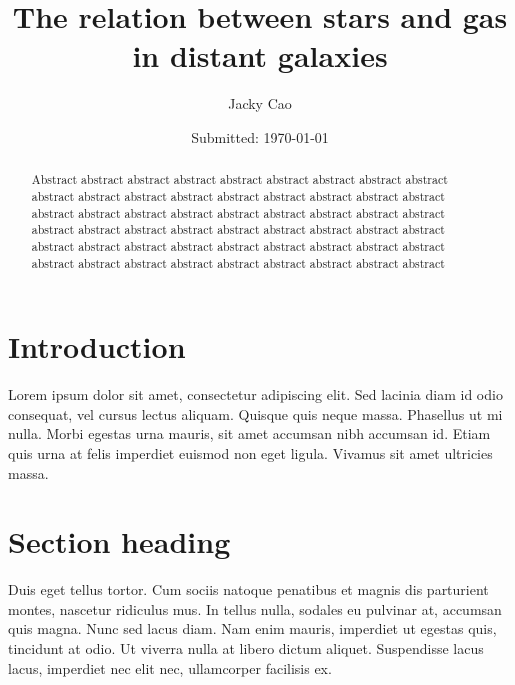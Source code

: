 \documentclass[12pt, onecolumn]{revtex4}    %
\begin{document}
                     


\title{The relation between stars and gas in distant galaxies} 
\date{Submitted: \today{}}
\author{Jacky Cao}

\begin{abstract}              
 
Abstract abstract abstract abstract abstract abstract abstract abstract abstract abstract abstract abstract abstract abstract abstract abstract abstract abstract abstract abstract abstract abstract abstract abstract abstract abstract abstract abstract abstract abstract abstract abstract abstract abstract abstract abstract abstract abstract abstract abstract abstract abstract abstract abstract abstract abstract abstract abstract abstract abstract abstract abstract abstract abstract 

\end{abstract}


\maketitle

\tableofcontents
\let\toc@pre\relax
\let\toc@post\relax

\newpage

\section{Introduction} 

Lorem ipsum dolor sit amet, consectetur adipiscing elit. Sed lacinia diam id odio consequat, vel cursus lectus aliquam. Quisque quis neque massa. Phasellus ut mi nulla. Morbi egestas urna mauris, sit amet accumsan nibh accumsan id. Etiam quis urna at felis imperdiet euismod non eget ligula. Vivamus sit amet ultricies massa. 

\section{Section heading} 

Duis eget tellus tortor. Cum sociis natoque penatibus et magnis dis parturient montes, nascetur ridiculus mus. In tellus nulla, sodales eu pulvinar at, accumsan quis magna. Nunc sed lacus diam. Nam enim mauris, imperdiet ut egestas quis, tincidunt at odio. Ut viverra nulla at libero dictum aliquet. Suspendisse lacus lacus, imperdiet nec elit nec, ullamcorper facilisis ex. 
\end{document}
